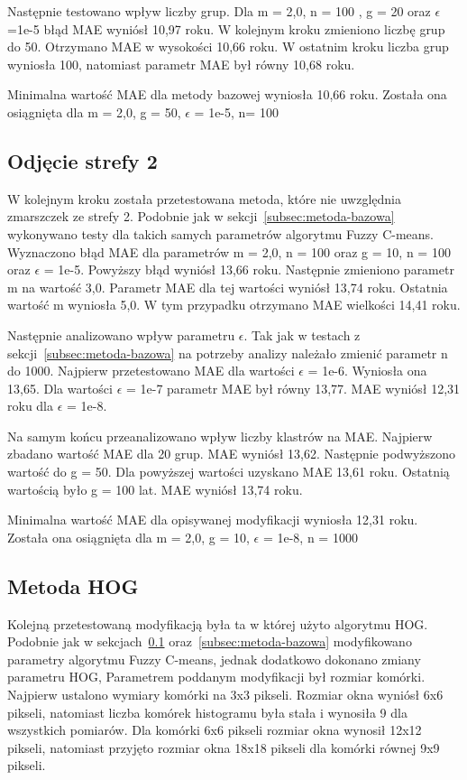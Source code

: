 \documentclass[a4paper,twoside,12pt]{book}
\begin{document}
    Następnie testowano wpływ liczby grup. Dla m = 2,0, n = 100 , g = 20 oraz $\epsilon$=1e-5 błąd MAE wyniósł 10,97 roku.
    W kolejnym kroku zmieniono liczbę grup do 50. Otrzymano MAE w wysokości 10,66 roku. W ostatnim kroku liczba grup
    wyniosła 100, natomiast parametr MAE był równy 10,68 roku.

    Minimalna wartość MAE dla metody bazowej wyniosła 10,66 roku.
    Została ona osiągnięta dla m = 2,0, g = 50, $\epsilon$ = 1e-5, n= 100


    \subsection{Odjęcie strefy 2}\label{subsec:odjęcie-strefy-2}
    W kolejnym kroku została przetestowana metoda, które nie uwzględnia zmarszczek ze strefy 2.
    Podobnie jak w sekcji~\ref{subsec:metoda-bazowa} wykonywano testy dla takich samych parametrów algorytmu Fuzzy
    C-means.
    Wyznaczono błąd MAE dla parametrów m = 2,0, n = 100 oraz g = 10, n = 100 oraz $\epsilon$ = 1e-5.
    Powyższy błąd wyniósł 13,66 roku.
    Następnie zmieniono parametr m na wartość 3,0. Parametr MAE dla tej wartości wyniósł 13,74 roku.
    Ostatnia wartość m wyniosła 5,0. W tym przypadku otrzymano MAE wielkości 14,41 roku.

    Następnie analizowano wpływ parametru $\epsilon$. Tak jak w testach z sekcji~\ref{subsec:metoda-bazowa} na
    potrzeby analizy należało
    zmienić parametr n do 1000.
    Najpierw przetestowano MAE dla wartości
    $\epsilon$ = 1e-6.
    Wyniosła ona 13,65. Dla wartości $\epsilon$ = 1e-7 parametr MAE był równy 13,77. MAE wyniósł 12,31 roku dla
    $\epsilon$ = 1e-8.

    Na samym końcu przeanalizowano wpływ liczby klastrów na MAE. Najpierw zbadano wartość MAE dla 20 grup. MAE
    wyniósł 13,62. Następnie podwyższono wartość do g = 50. Dla powyższej wartości uzyskano MAE 13,61 roku.
    Ostatnią wartością było g = 100 lat. MAE wyniósł 13,74 roku.

    Minimalna wartość MAE dla opisywanej modyfikacji wyniosła 12,31 roku.
    Została ona osiągnięta dla m = 2,0, g = 10, $\epsilon$ = 1e-8, n = 1000

    \subsection{Metoda HOG}\label{subsec:metoda-hog}
    Kolejną przetestowaną modyfikacją była ta w której użyto algorytmu HOG.
    Podobnie jak w sekcjach~\ref{subsec:odjęcie-strefy-2} oraz~\ref{subsec:metoda-bazowa} modyfikowano parametry
    algorytmu Fuzzy C-means, jednak dodatkowo dokonano zmiany parametru HOG, Parametrem poddanym modyfikacji był rozmiar komórki.
    Najpierw ustalono wymiary komórki na 3x3 pikseli. Rozmiar okna wyniósł 6x6 pikseli, natomiast liczba komórek
    histogramu była stała i wynosiła 9 dla wszystkich pomiarów. Dla komórki 6x6 pikseli rozmiar okna wynosił 12x12
    pikseli, natomiast przyjęto rozmiar okna 18x18 pikseli dla komórki równej 9x9 pikseli.
\end{document}
